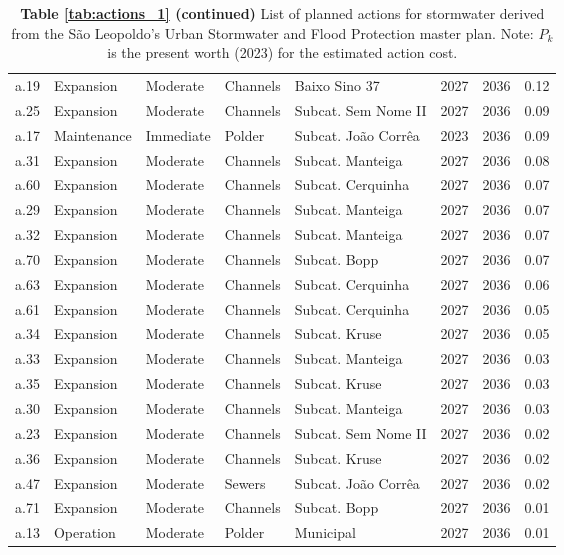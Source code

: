 \documentclass[12pt]{article}
\begin{document}
\begin{table}[h]
\begin{tabular}{lllllrrr}
a.19 &     Expansion &  Moderate & Channels &       Baixo Sino 37 &   2027 & 2036 &  0.12 \\
a.25 &     Expansion &  Moderate & Channels & Subcat. Sem Nome II &   2027 & 2036 &  0.09 \\
a.17 &   Maintenance & Immediate &   Polder & Subcat. João Corrêa &   2023 & 2036 &  0.09 \\
a.31 &     Expansion &  Moderate & Channels &    Subcat. Manteiga &   2027 & 2036 &  0.08 \\
a.60 &     Expansion &  Moderate & Channels &   Subcat. Cerquinha &   2027 & 2036 &  0.07 \\
a.29 &     Expansion &  Moderate & Channels &    Subcat. Manteiga &   2027 & 2036 &  0.07 \\
a.32 &     Expansion &  Moderate & Channels &    Subcat. Manteiga &   2027 & 2036 &  0.07 \\
a.70 &     Expansion &  Moderate & Channels &        Subcat. Bopp &   2027 & 2036 &  0.07 \\
a.63 &     Expansion &  Moderate & Channels &   Subcat. Cerquinha &   2027 & 2036 &  0.06 \\
a.61 &     Expansion &  Moderate & Channels &   Subcat. Cerquinha &   2027 & 2036 &  0.05 \\
a.34 &     Expansion &  Moderate & Channels &       Subcat. Kruse &   2027 & 2036 &  0.05 \\
a.33 &     Expansion &  Moderate & Channels &    Subcat. Manteiga &   2027 & 2036 &  0.03 \\
a.35 &     Expansion &  Moderate & Channels &       Subcat. Kruse &   2027 & 2036 &  0.03 \\
a.30 &     Expansion &  Moderate & Channels &    Subcat. Manteiga &   2027 & 2036 &  0.03 \\
a.23 &     Expansion &  Moderate & Channels & Subcat. Sem Nome II &   2027 & 2036 &  0.02 \\
a.36 &     Expansion &  Moderate & Channels &       Subcat. Kruse &   2027 & 2036 &  0.02 \\
a.47 &     Expansion &  Moderate &   Sewers & Subcat. João Corrêa &   2027 & 2036 &  0.02 \\
a.71 &     Expansion &  Moderate & Channels &        Subcat. Bopp &   2027 & 2036 &  0.01 \\
a.13 &     Operation &  Moderate &   Polder &           Municipal &   2027 & 2036 &  0.01 \\
\bottomrule
\end{tabular}
\caption*{\textbf{Table \ref{tab:actions_1} (continued)} List of planned actions for stormwater derived from the São Leopoldo's Urban Stormwater and Flood Protection master plan. Note: $P_k$ is the present worth (2023) for the estimated action cost.}
\end{table}
\end{document}
